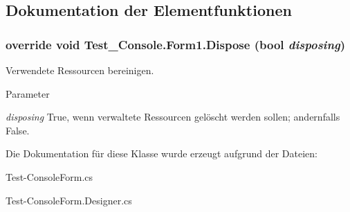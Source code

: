 \subsection{Dokumentation der Elementfunktionen}
\hypertarget{class_test___console_1_1_form1_a7fb762691a68d8aca1928a20ab2ebe77}{
\subsubsection[{Dispose}]{\setlength{\rightskip}{0pt plus 5cm}override void Test\_\-Console.Form1.Dispose (bool {\em disposing})}}
\label{class_test___console_1_1_form1_a7fb762691a68d8aca1928a20ab2ebe77}


Verwendete Ressourcen bereinigen. 


\begin{DoxyParams}{Parameter}
\item[{\em disposing}]True, wenn verwaltete Ressourcen gelöscht werden sollen; andernfalls False.\end{DoxyParams}


Die Dokumentation für diese Klasse wurde erzeugt aufgrund der Dateien:\begin{DoxyCompactItemize}
\item 
Test-\/ConsoleForm.cs\item 
Test-\/ConsoleForm.Designer.cs\end{DoxyCompactItemize}
